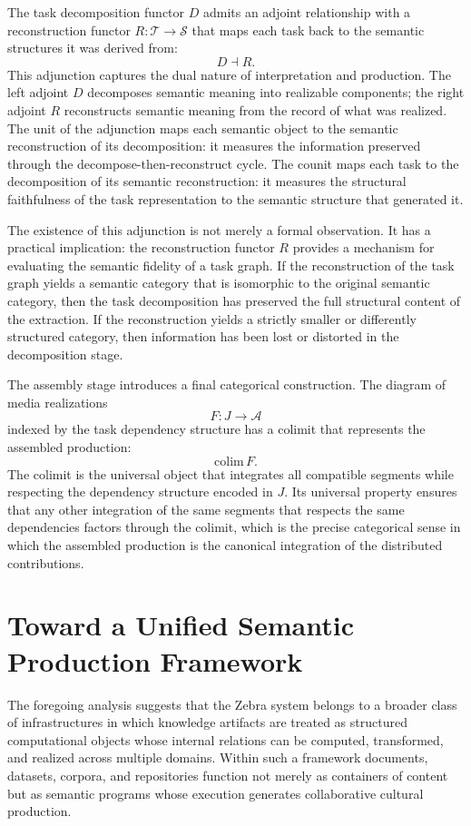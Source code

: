 \documentclass[12pt,a4paper]{article}
\begin{document}
The task decomposition functor $D$ admits an adjoint relationship with a reconstruction functor $R : \mathcal{T} \rightarrow \mathcal{S}$ that maps each task back to the semantic structures it was derived from:
\[
D \dashv R.
\]
This adjunction captures the dual nature of interpretation and production. The left adjoint $D$ decomposes semantic meaning into realizable components; the right adjoint $R$ reconstructs semantic meaning from the record of what was realized. The unit of the adjunction maps each semantic object to the semantic reconstruction of its decomposition: it measures the information preserved through the decompose-then-reconstruct cycle. The counit maps each task to the decomposition of its semantic reconstruction: it measures the structural faithfulness of the task representation to the semantic structure that generated it.

The existence of this adjunction is not merely a formal observation. It has a practical implication: the reconstruction functor $R$ provides a mechanism for evaluating the semantic fidelity of a task graph. If the reconstruction of the task graph yields a semantic category that is isomorphic to the original semantic category, then the task decomposition has preserved the full structural content of the extraction. If the reconstruction yields a strictly smaller or differently structured category, then information has been lost or distorted in the decomposition stage.

The assembly stage introduces a final categorical construction. The diagram of media realizations
\[
F : J \rightarrow \mathcal{A}
\]
indexed by the task dependency structure has a colimit that represents the assembled production:
\[
\mathrm{colim}\, F.
\]
The colimit is the universal object that integrates all compatible segments while respecting the dependency structure encoded in $J$. Its universal property ensures that any other integration of the same segments that respects the same dependencies factors through the colimit, which is the precise categorical sense in which the assembled production is the canonical integration of the distributed contributions.

\section{Toward a Unified Semantic Production Framework}

The foregoing analysis suggests that the Zebra system belongs to a broader class of infrastructures in which knowledge artifacts are treated as structured computational objects whose internal relations can be computed, transformed, and realized across multiple domains. Within such a framework documents, datasets, corpora, and repositories function not merely as containers of content but as semantic programs whose execution generates collaborative cultural production.
\end{document}
